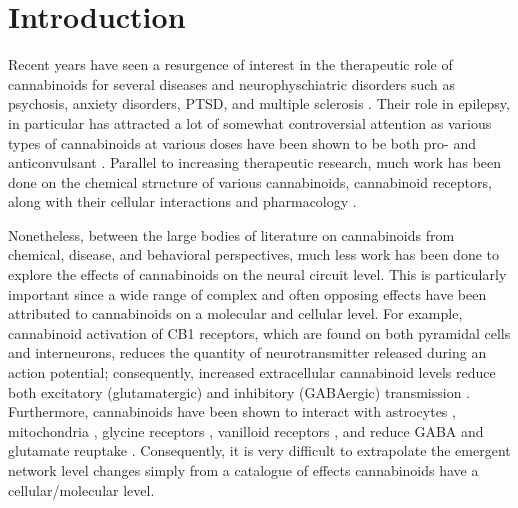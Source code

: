 \documentclass[11pt,a4paper,final]{article}
\begin{document}
\section{Introduction \label{intro}}

Recent years have seen a resurgence of interest in the therapeutic role of cannabinoids for several diseases and neurophyschiatric disorders such as psychosis, anxiety disorders, PTSD, and multiple sclerosis \citep{koppel14,fattore15}.
Their role in epilepsy, in particular has attracted a lot of somewhat controversial attention as various types of cannabinoids at various doses have been shown to be both pro- and anticonvulsant \citep{wallace01,blair06,deshpande07,rudenko12,katona15,hill13,katona15}.
Parallel to increasing therapeutic research, much work has been done on the chemical structure of various cannabinoids, cannabinoid receptors, along with their cellular interactions and pharmacology \citep{mechoulam14}.

Nonetheless, between the large bodies of literature on cannabinoids from chemical, disease, and behavioral perspectives, much less work has been done to explore the effects of cannabinoids on the neural circuit level.
This is particularly important since a wide range of complex and often opposing effects have been attributed to cannabinoids on a molecular and cellular level.
For example, cannabinoid activation of CB1 receptors, which are found on both pyramidal cells and interneurons, reduces the quantity of neurotransmitter released during an action potential; consequently, increased extracellular cannabinoid levels reduce both excitatory (glutamatergic) and inhibitory (GABAergic) transmission \citep{ozaita12}.
Furthermore, cannabinoids have been shown to interact with astrocytes \citep{metna15}, mitochondria \citep{benard12}, glycine receptors \citep{xiong11}, vanilloid receptors \citep{fawley14}, and reduce GABA and glutamate reuptake \citep{coull97,brown03}.
Consequently, it is very difficult to extrapolate the emergent network level changes simply from a catalogue of effects cannabinoids have a cellular/molecular level.
\end{document}
